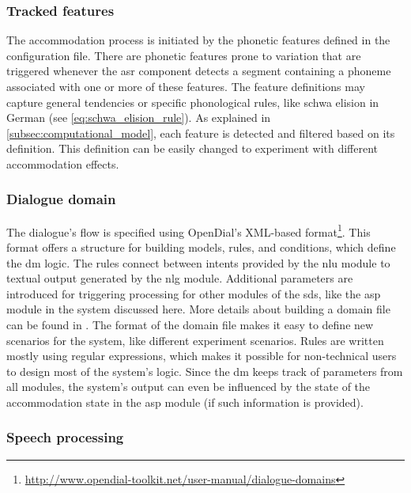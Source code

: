 \subsubsection{Tracked features}
\label{subsubsec:tracked_features}

The accommodation process is initiated by the phonetic features defined in the configuration file.
There are phonetic features prone to variation that are triggered whenever the \ac{asr} component detects a segment containing a phoneme associated with one or more of these features.
The feature definitions may capture general tendencies or specific phonological rules, like schwa elision in German (see \cref{eq:schwa_elision_rule}).
As explained in \cref{subsec:computational_model}, each feature is detected and filtered based on its definition.
This definition can be easily changed to experiment with different accommodation effects.

\subsubsection{Dialogue domain}
\label{subsubsec:dialogue_domain}

The dialogue's flow is specified using OpenDial's XML-based format\footnote{\url{http://www.opendial-toolkit.net/user-manual/dialogue-domains}}.
This format offers a structure for building models, rules, and conditions, which define the \ac{dm} logic.
The rules connect between intents provided by the \ac{nlu} module to textual output generated by the \ac{nlg} module.
Additional parameters are introduced for triggering processing for other modules of the \ac{sds}, like the \ac{asp} module in the system discussed here.
More details about building a domain file can be found in \citet{Lison2016opendial}.
The format of the domain file makes it easy to define new scenarios for the system, like different experiment scenarios.
Rules are written mostly using regular expressions, which makes it possible for non-technical users to design most of the system's logic.
Since the \ac{dm} keeps track of parameters from all modules, the system's output can even be influenced by the state of the accommodation state in the \ac{asp} module (if such information is provided).

\subsubsection{Speech processing}
\label{subsubsec:speech_processing}

